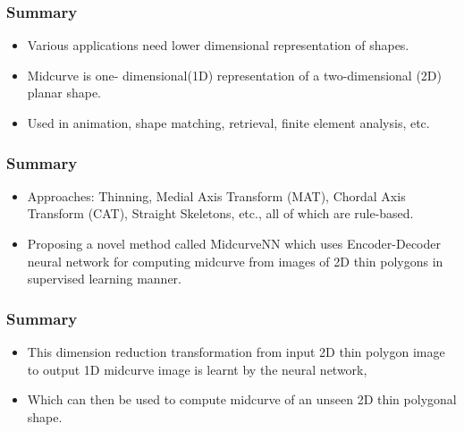 \begin{frame}[fragile]\frametitle{Summary}
	\begin{itemize}
	\item Various applications need lower dimensional representation of shapes. 
	\item Midcurve is one- dimensional(1D) representation of a two-dimensional (2D) planar shape. 
	\item Used in animation, shape matching, retrieval, finite element analysis, etc. 
	\end{itemize}	
\end{frame}

\begin{frame}[fragile]\frametitle{Summary}
	\begin{itemize}
	\item Approaches: Thinning, Medial Axis Transform (MAT), Chordal Axis Transform (CAT), Straight Skeletons, etc., all of which are rule-based.
	\item Proposing a novel method called MidcurveNN which uses Encoder-Decoder neural network for computing midcurve from images of 2D thin polygons in supervised learning manner. 
	\end{itemize}	
\end{frame}

\begin{frame}[fragile]\frametitle{Summary}
	\begin{itemize}
	\item This dimension reduction transformation from input 2D thin polygon image to output 1D midcurve image is learnt by the neural network,
	\item Which can then be used to compute midcurve of an unseen 2D thin polygonal shape.
	\end{itemize}	
\end{frame}